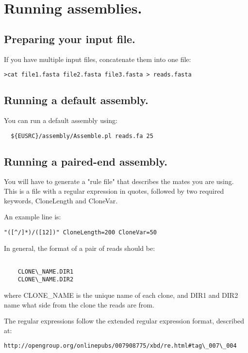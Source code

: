 \documentclass{article}[12pt]
\begin{document}
\section{ Running assemblies.}

 
\subsection{ Preparing your input file.}
     
		 If you have multiple input files, concatenate them into one file:


\begin{verbatim}
>cat file1.fasta file2.fasta file3.fasta > reads.fasta
\end{verbatim}

  
 
  \subsection{Running a default assembly.}
  
  You can run a default assembly using:

\begin{verbatim}
  ${EUSRC}/assembly/Assemble.pl reads.fa 25
\end{verbatim}

 \subsection{Running a paired-end assembly.}

	You will have to generate a "rule file" that describes the mates you
	are using.  This is a file with a regular expression in quotes,
	followed by two required keywords, CloneLength and CloneVar.

  An example line is:
\begin{verbatim}
"([^/]*)/([12])" CloneLength=200 CloneVar=50
\end{verbatim}

	In general, the format of a pair of reads	should be:
\begin{verbatim}
  
	CLONE\_NAME.DIR1
	CLONE\_NAME.DIR2
\end{verbatim}

	where CLONE\_NAME is the unique name of each clone, and DIR1 and DIR2
	name what side from the clone the reads are from.

	The regular expressions follow the extended regular expression
	format, described at:
\begin{verbatim}
http://opengroup.org/onlinepubs/007908775/xbd/re.html#tag\_007\_004
\end{verbatim}
\end{document}
